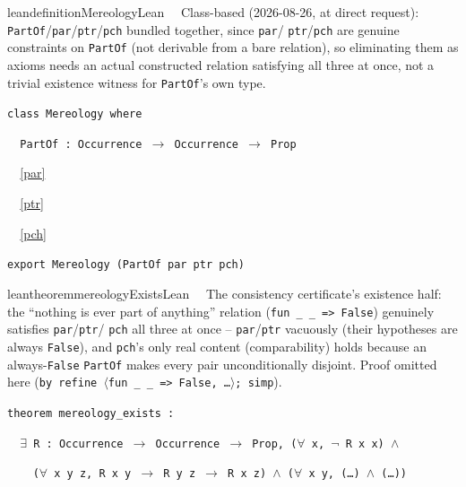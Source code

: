 \begin{restatable}{leandefinition}{MereologyLean}~~ Class-based (2026-08-26, at direct
request): \texttt{PartOf}/\texttt{par}/\texttt{ptr}/\texttt{pch} bundled together, since \texttt{par}/
\texttt{ptr}/\texttt{pch} are genuine constraints on \texttt{PartOf} (not derivable from a bare relation),
so eliminating them as axioms needs an actual constructed relation satisfying all three at once, not a
trivial existence witness for \texttt{PartOf}'s own type.

\texttt{\textcolor{leancolor}{class} \textcolor{leanyellow}{Mereology} \textcolor{leancolor}{where}}

\texttt{~~PartOf : Occurrence $\to$ Occurrence $\to$ Prop}

\texttt{~~}\ref{par}

\texttt{~~}\ref{ptr}

\texttt{~~}\ref{pch}

\texttt{\textcolor{leancolor}{export} Mereology (PartOf par ptr pch)}
\label{Mereology}
\end{restatable}

\begin{restatable}{leantheorem}{mereologyExistsLean}~~ The consistency
certificate's existence half: the ``nothing is ever part of anything'' relation
(\texttt{\textcolor{leancolor}{fun} \_ \_ => False}) genuinely satisfies \texttt{par}/\texttt{ptr}/
\texttt{pch} all three at once -- \texttt{par}/\texttt{ptr} vacuously (their hypotheses are always
\texttt{False}), and \texttt{pch}'s only real content (comparability) holds because an always-\texttt{False}
\texttt{PartOf} makes every pair unconditionally disjoint. Proof omitted here (\texttt{by refine
$\langle$fun \_ \_ => False, \ldots$\rangle$; simp}).

\texttt{\textcolor{leancolor}{theorem} \textcolor{leanyellow}{mereology\_exists} :}

\texttt{~~$\exists$ R : Occurrence $\to$ Occurrence $\to$ Prop, ($\forall$ x, $\lnot$ R x x) $\wedge$}

\texttt{~~~~($\forall$ x y z, R x y $\to$ R y z $\to$ R x z) $\wedge$ ($\forall$ x y, (\ldots) $\wedge$ (\ldots))}
\label{mereology_exists}
\end{restatable}

